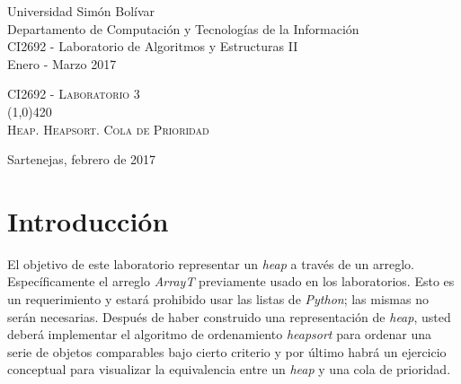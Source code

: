 \documentclass[11pt,letterpaper]{article}
\begin{document}
\thispagestyle{empty}

\begin{flushleft}
Universidad Simón Bolívar \\
Departamento de Computación y Tecnologías de la Información \\
CI2692 - Laboratorio de Algoritmos y Estructuras II \\
Enero - Marzo 2017
\end{flushleft}

\vfill

\begin{center}
\textsc{\LARGE CI2692 - Laboratorio 3} \\

\line(1,0){420} \\
\vspace{1em}
\textsc{\LARGE Heap. Heapsort. Cola de Prioridad}
\end{center}

\vfill

\begin{center}
Sartenejas, febrero de 2017
\end{center}

\newpage

\section*{Introducción}

\sloppy
El objetivo de este laboratorio representar un \textit{heap} a través de un arreglo.
Específicamente el arreglo \textit{ArrayT} previamente usado en los laboratorios.
Esto es un requerimiento y estará prohibido usar las listas de \textit{Python};
las mismas no serán necesarias. Después de haber construido una
representación de \textit{heap}, usted deberá implementar el algoritmo de
ordenamiento \textit{heapsort} para ordenar una serie de objetos comparables bajo
cierto criterio y por último habrá un ejercicio conceptual para visualizar
la equivalencia entre un \textit{heap} y una cola de prioridad.
\end{document}

